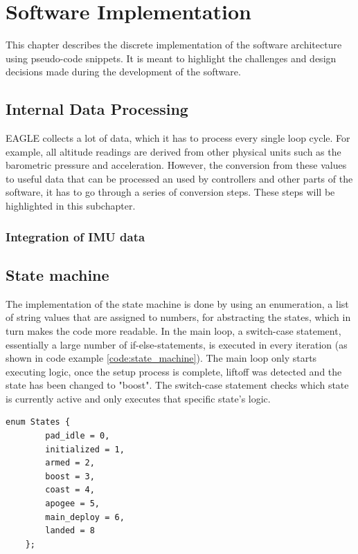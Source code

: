 \documentclass[fontsize=11pt,%
twoside,%
BCOR          = 8mm, %
DIV           = 11,  %
titlepage     = off,%
index=totoc,%
xcolor        = pdftex,%
dvipsnames,%
bibliography  = totoc,%
bibliography = numbered, %
listof        = notnumbered]{scrreprt}
\begin{document}
\chapter{Software Implementation}
This chapter describes the discrete implementation of the software architecture using pseudo-code snippets. It is meant to highlight the challenges and design decisions made during the development of the software.

\section{Internal Data Processing}
EAGLE collects a lot of data, which it has to process every single loop cycle. For example, all altitude readings are derived from other physical units such as the barometric pressure and acceleration. However, the conversion from these values to useful data that can be processed an used by controllers and other parts of the software, it has to go through a series of conversion steps. These steps will be highlighted in this subchapter.

\subsection{Integration of IMU data}



\section{State machine}
The implementation of the state machine is done by using an enumeration, a list of string values that are assigned to numbers, for abstracting the states, which in turn makes the code more readable. In the main loop, a switch-case statement, essentially a large number of if-else-statements, is executed in every iteration (as shown in code example \ref{code:state_machine}). The main loop only starts executing logic, once the setup process is complete, liftoff was detected and the state has been changed to "boost". The switch-case statement checks which state is currently active and only executes that specific state's logic.

\begin{lstlisting}[caption={States enumeration}, label={code:enum}]
	enum States {
		pad_idle = 0,
		initialized = 1,
		armed = 2,
		boost = 3,
		coast = 4,
		apogee = 5,
		main_deploy = 6,
		landed = 8
	};
\end{lstlisting}
\end{document}

